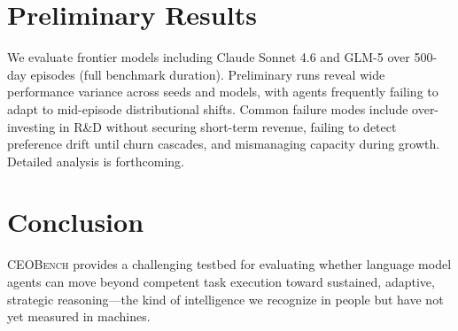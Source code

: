 \documentclass[10pt,letterpaper,twocolumn]{article}
\begin{document}
\section{Preliminary Results}

We evaluate frontier models including Claude Sonnet 4.6 and GLM-5 over 500-day episodes (full benchmark duration). Preliminary runs reveal wide performance variance across seeds and models, with agents frequently failing to adapt to mid-episode distributional shifts. Common failure modes include over-investing in R\&D without securing short-term revenue, failing to detect preference drift until churn cascades, and mismanaging capacity during growth. Detailed analysis is forthcoming.

\section{Conclusion}

\textsc{CEOBench} provides a challenging testbed for evaluating whether language model agents can move beyond competent task execution toward sustained, adaptive, strategic reasoning---the kind of intelligence we recognize in people but have not yet measured in machines.

{\small


}
\end{document}
